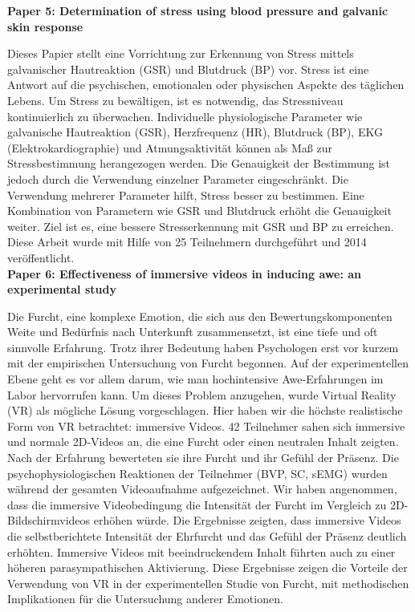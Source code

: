 \textbf{Paper 5: Determination of stress using blood pressure and galvanic skin response}

Dieses Papier stellt eine Vorrichtung zur Erkennung von Stress mittels galvanischer Hautreaktion (GSR) und Blutdruck (BP) vor. 
Stress ist eine Antwort auf die psychischen, emotionalen oder physischen Aspekte des täglichen Lebens. 
Um Stress zu bewältigen, ist es notwendig, das Stressniveau kontinuierlich zu überwachen. 
Individuelle physiologische Parameter wie galvanische Hautreaktion (GSR), Herzfrequenz (HR), Blutdruck (BP), EKG (Elektrokardiographie) und Atmungsaktivität können als Maß zur Stressbestimmung herangezogen werden. 
Die Genauigkeit der Bestimmung ist jedoch durch die Verwendung einzelner Parameter eingeschränkt. 
Die Verwendung mehrerer Parameter hilft, Stress besser zu bestimmen. 
Eine Kombination von Parametern wie GSR und Blutdruck erhöht die Genauigkeit weiter. 
Ziel ist es, eine bessere Stresserkennung mit GSR und BP zu erreichen. 
Diese Arbeit wurde mit Hilfe von 25 Teilnehmern durchgeführt und 2014 veröffentlicht. \\


\textbf{Paper 6: Effectiveness of immersive videos in inducing awe: an experimental study}

Die Furcht, eine komplexe Emotion, die sich aus den Bewertungskomponenten Weite und Bedürfnis nach Unterkunft zusammensetzt, ist eine tiefe und oft sinnvolle Erfahrung. 
Trotz ihrer Bedeutung haben Psychologen erst vor kurzem mit der empirischen Untersuchung von Furcht begonnen. 
Auf der experimentellen Ebene geht es vor allem darum, wie man hochintensive Awe-Erfahrungen im Labor hervorrufen kann. 
Um dieses Problem anzugehen, wurde Virtual Reality (VR) als mögliche Lösung vorgeschlagen. 
Hier haben wir die höchste realistische Form von VR betrachtet: immersive Videos. 
42 Teilnehmer sahen sich immersive und normale 2D-Videos an, die eine Furcht oder einen neutralen Inhalt zeigten. 
Nach der Erfahrung bewerteten sie ihre Furcht und ihr Gefühl der Präsenz. 
Die psychophysiologischen Reaktionen der Teilnehmer (BVP, SC, sEMG) wurden während der gesamten Videoaufnahme aufgezeichnet. 
Wir haben angenommen, dass die immersive Videobedingung die Intensität der Furcht im Vergleich zu 2D-Bildschirmvideos erhöhen würde. 
Die Ergebnisse zeigten, dass immersive Videos die selbstberichtete Intensität der Ehrfurcht und das Gefühl der Präsenz deutlich erhöhten. 
Immersive Videos mit beeindruckendem Inhalt führten auch zu einer höheren parasympathischen Aktivierung. 
Diese Ergebnisse zeigen die Vorteile der Verwendung von VR in der experimentellen Studie von Furcht, mit methodischen Implikationen für die Untersuchung anderer Emotionen. \\


